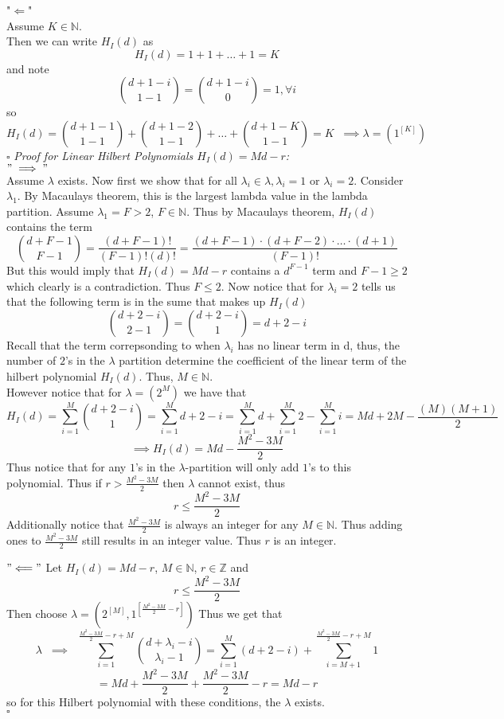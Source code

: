 \documentclass[11pt]{amsart}
\newcommand{\Z}{\mathbb{Z}}
\newcommand{\N}{\mathbb{N}}
\theoremstyle{plain}
\theoremstyle{definition}
\begin{document}
"$\Longleftarrow$"\\
Assume $K\in \N$.\\
Then we can write $H_I(d)$ as
\[H_I(d)=1+1+\hdots+1 =K\]
and note
\[\binom{d+1-i}{1-1} =\binom{d+1-i}{0} = 1, \forall i \]
so
\[H_I(d)=\binom{d+1-1}{1-1}+\binom{d+1-2}{1-1}+\hdots+\binom{d+1-K}{1-1} = K \;\; \implies \lambda=(1^{[K]})\]
\hfill $\square$
\newpage
\textit{Proof for Linear Hilbert Polynomials $H_I(d)=Md-r$:}\\
$"\implies"$\\
Assume $\lambda$ exists. Now first we show that  for all $\lambda_i\in \lambda, \lambda_i =1$ or $\lambda_i=2$. Consider $\lambda_1$. By Macaulays theorem, this is the largest lambda value in the lambda partition. Assume $\lambda_1=F>2$, $F\in \N$. Thus by Macaulays theorem, $H_I(d)$ contains the term
\[\binom{d+F-1}{F-1}= \frac{(d+F-1)!}{(F-1)!(d)!}= \frac{(d+F-1)\cdot(d+F-2)\cdot\hdots\cdot(d+1)}{(F-1)!}\]
But this would imply that $H_I(d)=Md-r$ contains a $d^{F-1}$ term and $F-1\geq2$ which clearly is a contradiction. Thus $F\leq 2$. Now notice that for $\lambda_i=2$ tells us that the following term is in the sume that makes up $H_I(d)$
\[\binom{d+2-i}{2-1}=\binom{d+2-i}{1}=d+2-i\]
Recall that the term correpsonding to when $\lambda_i$ has no linear term in d, thus, the number of $2$'s in the $\lambda$ partition determine the coefficient of the linear term of the hilbert polynomial $H_I(d)$. Thus, $M\in \N$. \\
However notice that for $\lambda=(2^{M})$ we have that
\[H_I(d)= \sum_{i=1}^{M}\binom{d+2-i}{1}=\sum_{i=1}^{M}d+2-i=\sum_{i=1}^{M}d +\sum_{i=1}^{M}2-\sum_{i=1}^{M}i =Md+2M-\frac{(M)(M+1)}{2}\]
\[\implies H_I(d)= Md-\frac{M^2-3M}{2}\]
Thus notice that for any $1$'s in the $\lambda$-partition will only add $1$'s to this polynomial. Thus if $r> \frac{M^2-3M}{2}$ then $\lambda$ cannot exist, thus
\[r\leq \frac{M^2-3M}{2} \]
Additionally notice that $\frac{M^2-3M}{2}$ is always an integer for any $M\in \N$. Thus adding ones to $\frac{M^2-3M}{2}$ still results in an integer value. Thus $r$ is an integer.\\

\newpage

$"\Longleftarrow"$
Let $H_I(d)=Md-r$, $M\in \N$, $r\in \Z$ and
\[r\leq \frac{M^2-3M}{2}\]
Then choose 
$\lambda=(2^{[M]},1^{[\frac{M^2-3M}{2}-r]})$
Thus we get that
\[\lambda \;\; \implies \;\; \sum_{i=1}^{\frac{M^2-3M}{2}-r+M}\binom{d+\lambda_i-i}{\lambda_i-1} = \sum_{i=1}^{M}(d+2-i) + \sum_{i=M+1}^{\frac{M^2-3M}{2}-r+M}1 \]
\[= Md+\frac{M^2-3M}{2}+\frac{M^2-3M}{2}-r = Md-r\]
so for this Hilbert polynomial with these conditions, the $\lambda$ exists.\\
\vspace{1mm}
\hfill $\square$
\end{document}
